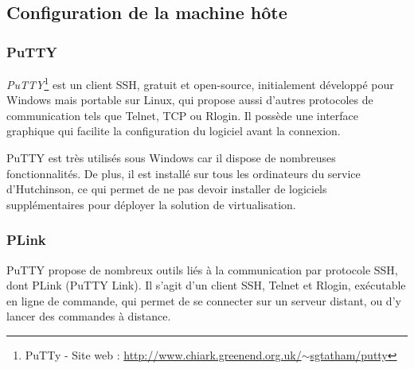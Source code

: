
\subsection{Configuration de la machine hôte}


\subsubsection{PuTTY}
\label{PuTTY}

\textit{PuTTY}\footnote{PuTTy - Site web : \href{http://www.chiark.greenend.org.uk/~sgtatham/putty}{http://www.chiark.greenend.org.uk/$\sim$sgtatham/putty}} est un client SSH, gratuit et open-source, initialement développé pour Windows mais portable sur Linux, qui propose aussi d'autres protocoles de communication tels que Telnet, TCP ou Rlogin.
Il possède une interface graphique qui facilite la configuration du logiciel avant la connexion.

PuTTY est très utilisés sous Windows car il dispose de nombreuses fonctionnalités.
De plus, il est installé sur tous les ordinateurs du service d'Hutchinson, ce qui permet de ne pas devoir installer de logiciels supplémentaires pour déployer la solution de virtualisation.
\\




\subsubsection{PLink}
\label{PLink}

PuTTY propose de nombreux outils liés à la communication par protocole SSH, dont PLink (PuTTY Link).
Il s'agit d'un client SSH, Telnet et Rlogin, exécutable en ligne de commande, qui permet de se connecter sur un serveur distant, ou d'y lancer des commandes à distance.
\\




